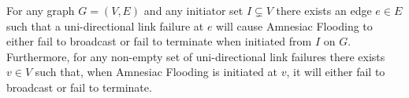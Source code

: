     \begin{*theorem}
    \label{thm: directed}
        For any graph $G=(V,E)$ and any initiator set $I\subsetneq V$ there exists an edge $e \in E$ such that a uni-directional link failure at $e$ will cause Amnesiac Flooding to either fail to broadcast or fail to terminate when initiated from $I$ on $G$. Furthermore, for any non-empty set of uni-directional link failures there exists $v \in V$ such that, when Amnesiac Flooding is initiated at $v$, it will either fail to broadcast or fail to terminate.
    \end{*theorem}